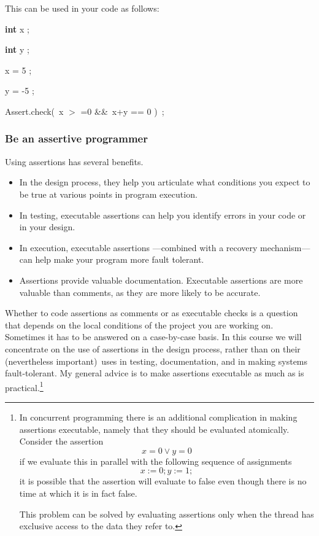\documentclass[11pt]{article}%
\begin{document}
\noindent This can be used in your code as follows:

\begin{code}
\textbf{int} x ;

\textbf{int} y ;

x = 5 ;

y = -5 ;

Assert.check(\ x
$>$%
=0 \&\&\ x+y == 0 )\ ;
\end{code}

\subsubsection{Be an assertive programmer}

Using assertions has several benefits.

\begin{itemize}
\item In the design process, they help you articulate what conditions you
expect to be true at various points in program execution.

\item In testing, executable assertions can help you identify errors in your
code or in your design.

\item In execution, executable assertions ---combined with a recovery
mechanism--- can help make your program more fault tolerant.

\item Assertions provide valuable documentation. Executable assertions are
more valuable than comments, as they are more likely to be accurate.
\end{itemize}

Whether to code assertions as comments or as executable checks is a question
that depends on the local conditions of the project you are working on.
Sometimes it has to be answered on a case-by-case basis. In this course we
will concentrate on the use of assertions in the design process, rather than
on their (nevertheless important)\ uses in testing, documentation, and in
making systems fault-tolerant. My general advice is to make assertions
executable as much as is practical.\footnote{In concurrent programming there
is an additional complication in making assertions executable, namely that
they should be evaluated atomically. Consider the assertion%
\[
x=0\vee y=0
\]
if we evaluate this in parallel with the following sequence of assignments%
\[
x:=0;y:=1;
\]
it is possible that the assertion will evaluate to false even though there is
no time at which it is in fact false.
\par
This problem can be solved by evaluating assertions only when the thread has
exclusive access to the data they refer to.}
\end{document}
